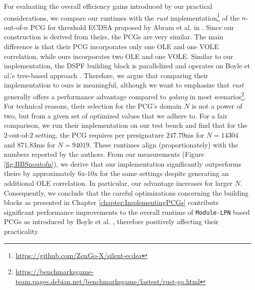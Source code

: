 For evaluating the overall efficiency gains introduced by our practical considerations, we compare our runtimes with the \textit{rust} implementation\footnote{\url{https://github.com/ZenGo-X/silent-ecdsa}} of the $n$-out-of-$n$ PCG for threshold ECDSA proposed by Abram et al. in \cite{abram2022low}. Since our construction is derived from theirs, the PCGs are very similar. The main difference is that their PCG incorporates only one OLE and one VOLE correlation, while ours incorporates two OLE and one VOLE. Similar to our implementation, the DSPF building block is parallelized and operates on Boyle et al.'s tree-based approach \cite{boyle2016function}. Therefore, we argue that comparing their implementation to ours is meaningful, although we want to emphasize that \textit{rust} generally offers a performance advantage compared to \textit{golang} in most scenarios\footnote{\url{https://benchmarksgame-team.pages.debian.net/benchmarksgame/fastest/rust-go.html}}. For technical reasons, their selection for the PCG's domain $N$ is not a power of two, but from a given set of optimized values that we adhere to. For a fair comparison, we run their implementation on our test bench and find that for the $2$-out-of-$2$ setting, the PCG requires per presignature $247.79$ms for $N=14304$ and $871.83$ms for $N=94019$. These runtimes align (proportionately) with the numbers reported by the authors. From our measurements (Figure \ref{fig:BBSnoutofn}), we derive that our implementation significantly outperforms theirs by approximately $6$x-$10$x for the same settings despite generating an additional OLE correlation. In particular, our advantage increases for larger $N$. Consequently, we conclude that the careful optimizations concerning the building blocks as presented in Chapter \ref{chapter:ImplementingPCGs} contribute significant performance improvements to the overall runtime of \texttt{Module-LPN} based PCGs as introduced by Boyle et al. \cite{boyle2020efficient}, therefore positively affecting their practicality. 

